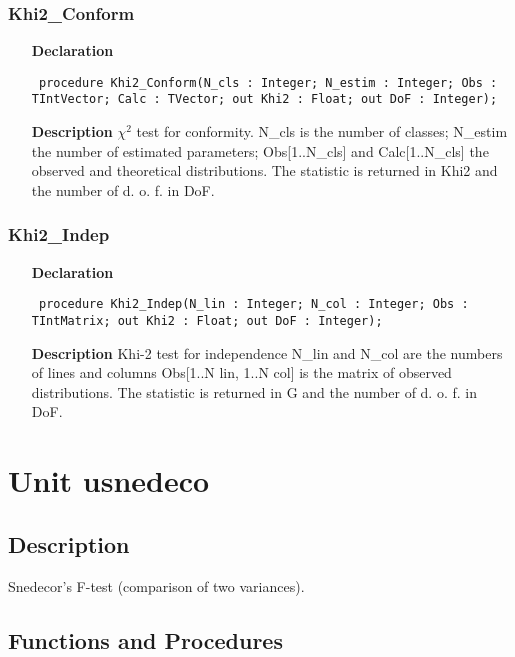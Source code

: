 \documentclass[12pt,a4paper,oneside]{report}
\newcommand{\declarationitem}[1]{\textbf{#1}}
\newcommand{\descriptiontitle}[1]{\textbf{#1}}
\newcommand{\code}[1]{\texttt{#1}}
\begin{document}
\subsubsection{Khi2{\_}Conform}
\label{ukhi2-Khi2_Conform}
\begin{itemize}\item[\declarationitem{Declaration}\hfill]
	\begin{flushleft}
		\code{
			procedure Khi2{\_}Conform(N{\_}cls : Integer; N{\_}estim : Integer; Obs : TIntVector; Calc : TVector; out Khi2 : Float; out DoF : Integer);}
	\end{flushleft}
	\item[\descriptiontitle{Description}]
	$\chi^2$ test for conformity. N{\_}cls is the number of classes; N{\_}estim the number of estimated parameters; Obs[1..N{\_}cls] and Calc[1..N{\_}cls] the observed and theoretical distributions. The statistic is returned in Khi2 and the number of d. o. f. in DoF.
\end{itemize}
\subsubsection{Khi2{\_}Indep}
\label{ukhi2-Khi2_Indep}
\begin{itemize}\item[\declarationitem{Declaration}\hfill]
	\begin{flushleft}
		\code{
			procedure Khi2{\_}Indep(N{\_}lin : Integer; N{\_}col : Integer; Obs : TIntMatrix; out Khi2 : Float; out DoF : Integer);}
	\end{flushleft}
	\item[\descriptiontitle{Description}]
	Khi{-}2 test for independence N{\_}lin and N{\_}col are the numbers of lines and columns Obs[1..N lin, 1..N col] is the matrix of observed distributions. The statistic is returned in G and the number of d. o. f. in DoF.
\end{itemize}

\section{Unit usnedeco}
\label{usnedeco}
\subsection{Description}
Snedecor's F{-}test (comparison of two variances). 
\subsection{Functions and Procedures}
\end{document}
